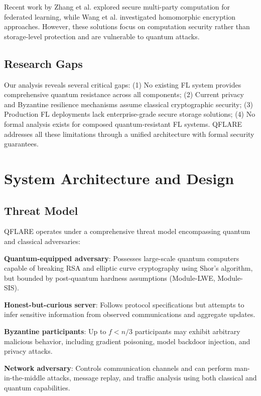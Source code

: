 \documentclass[conference]{IEEEtran}
\begin{document}
Recent work by Zhang et al. \cite{zhang2021secure} explored secure multi-party computation for federated learning, while Wang et al. \cite{wang2020secure} investigated homomorphic encryption approaches. However, these solutions focus on computation security rather than storage-level protection and are vulnerable to quantum attacks.

\subsection{Research Gaps}

Our analysis reveals several critical gaps: (1) No existing FL system provides comprehensive quantum resistance across all components; (2) Current privacy and Byzantine resilience mechanisms assume classical cryptographic security; (3) Production FL deployments lack enterprise-grade secure storage solutions; (4) No formal analysis exists for composed quantum-resistant FL systems. QFLARE addresses all these limitations through a unified architecture with formal security guarantees.

\section{System Architecture and Design}

\subsection{Threat Model}

QFLARE operates under a comprehensive threat model encompassing quantum and classical adversaries:

\textbf{Quantum-equipped adversary}: Possesses large-scale quantum computers capable of breaking RSA and elliptic curve cryptography using Shor's algorithm, but bounded by post-quantum hardness assumptions (Module-LWE, Module-SIS).

\textbf{Honest-but-curious server}: Follows protocol specifications but attempts to infer sensitive information from observed communications and aggregate updates.

\textbf{Byzantine participants}: Up to $f < n/3$ participants may exhibit arbitrary malicious behavior, including gradient poisoning, model backdoor injection, and privacy attacks.

\textbf{Network adversary}: Controls communication channels and can perform man-in-the-middle attacks, message replay, and traffic analysis using both classical and quantum capabilities.
\end{document}
